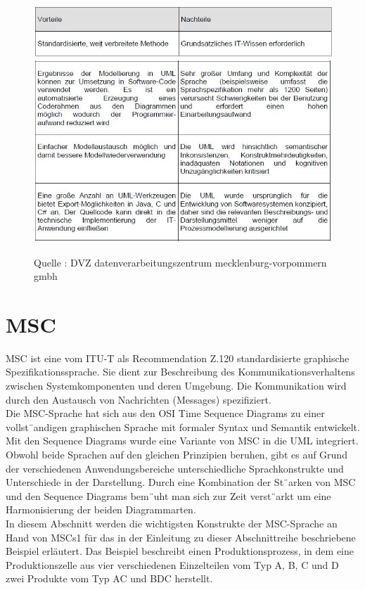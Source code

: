 \begin{center}
\begin{figure}[h]
   

\includegraphics[scale=0.8]{Graphics/vornach.jpg}
\includegraphics[scale=0.8]{Graphics/vornach2.jpg} 


Quelle : DVZ datenverarbeitungszentrum mecklenburg-vorpommern gmbh 

 
\label{fig6}


\end{figure}

\end{center}
\newpage
\section{MSC}
MSC ist eine vom ITU-T als Recommendation Z.120
standardisierte graphische Spezifikationssprache. Sie dient
zur Beschreibung des Kommunikationsverhaltens zwischen
Systemkomponenten und deren Umgebung. Die Kommunikation
wird durch den Austausch von Nachrichten (Messages)
spezifiziert.\\
Die MSC-Sprache hat sich aus den OSI Time Sequence
Diagrams zu einer vollst¨andigen graphischen Sprache
mit formaler Syntax und Semantik entwickelt.
Mit den Sequence Diagrams wurde eine Variante von MSC
in die UML integriert. Obwohl beide Sprachen auf den
gleichen Prinzipien beruhen, gibt es auf Grund der verschiedenen
Anwendungsbereiche unterschiedliche Sprachkonstrukte
und Unterschiede in der Darstellung. Durch eine
Kombination der St¨arken von MSC und den Sequence
Diagrams bem¨uht man sich zur Zeit verst¨arkt um eine Harmonisierung der beiden Diagrammarten.\\
In diesem Abschnitt werden die wichtigsten Konstrukte der
MSC-Sprache an Hand von MSCs1 für das in der Einleitung zu dieser Abschnittreihe beschriebene Beispiel erläutert. Das Beispiel beschreibt einen Produktionsprozess, in dem eine Produktionszelle aus vier verschiedenen Einzelteilen vom Typ A, B, C und D zwei Produkte vom Typ AC und BDC herstellt.


